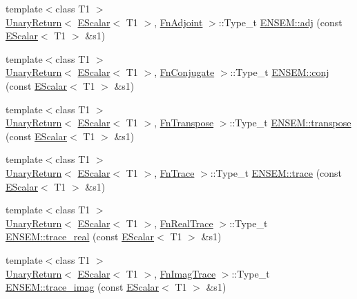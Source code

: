 \begin{DoxyCompactItemize}
\item 
{\footnotesize template$<$class T1 $>$ }\\\mbox{\hyperlink{structENSEM_1_1UnaryReturn}{Unary\+Return}}$<$ \mbox{\hyperlink{classENSEM_1_1EScalar}{E\+Scalar}}$<$ T1 $>$, \mbox{\hyperlink{structENSEM_1_1FnAdjoint}{Fn\+Adjoint}} $>$\+::Type\+\_\+t \mbox{\hyperlink{group__escalar_ga51071562edd203962f48e4b44f0c0a0c}{E\+N\+S\+E\+M\+::adj}} (const \mbox{\hyperlink{classENSEM_1_1EScalar}{E\+Scalar}}$<$ T1 $>$ \&s1)
\item 
{\footnotesize template$<$class T1 $>$ }\\\mbox{\hyperlink{structENSEM_1_1UnaryReturn}{Unary\+Return}}$<$ \mbox{\hyperlink{classENSEM_1_1EScalar}{E\+Scalar}}$<$ T1 $>$, \mbox{\hyperlink{structENSEM_1_1FnConjugate}{Fn\+Conjugate}} $>$\+::Type\+\_\+t \mbox{\hyperlink{group__escalar_ga291c7e9b7f872b3e6db0d75ff3421b6a}{E\+N\+S\+E\+M\+::conj}} (const \mbox{\hyperlink{classENSEM_1_1EScalar}{E\+Scalar}}$<$ T1 $>$ \&s1)
\item 
{\footnotesize template$<$class T1 $>$ }\\\mbox{\hyperlink{structENSEM_1_1UnaryReturn}{Unary\+Return}}$<$ \mbox{\hyperlink{classENSEM_1_1EScalar}{E\+Scalar}}$<$ T1 $>$, \mbox{\hyperlink{structENSEM_1_1FnTranspose}{Fn\+Transpose}} $>$\+::Type\+\_\+t \mbox{\hyperlink{group__escalar_ga5b02d7d8a00b851a2452fb03861a9401}{E\+N\+S\+E\+M\+::transpose}} (const \mbox{\hyperlink{classENSEM_1_1EScalar}{E\+Scalar}}$<$ T1 $>$ \&s1)
\item 
{\footnotesize template$<$class T1 $>$ }\\\mbox{\hyperlink{structENSEM_1_1UnaryReturn}{Unary\+Return}}$<$ \mbox{\hyperlink{classENSEM_1_1EScalar}{E\+Scalar}}$<$ T1 $>$, \mbox{\hyperlink{structENSEM_1_1FnTrace}{Fn\+Trace}} $>$\+::Type\+\_\+t \mbox{\hyperlink{group__escalar_ga4c3bf5ecccbf7b690868af26ec7d8ca6}{E\+N\+S\+E\+M\+::trace}} (const \mbox{\hyperlink{classENSEM_1_1EScalar}{E\+Scalar}}$<$ T1 $>$ \&s1)
\item 
{\footnotesize template$<$class T1 $>$ }\\\mbox{\hyperlink{structENSEM_1_1UnaryReturn}{Unary\+Return}}$<$ \mbox{\hyperlink{classENSEM_1_1EScalar}{E\+Scalar}}$<$ T1 $>$, \mbox{\hyperlink{structENSEM_1_1FnRealTrace}{Fn\+Real\+Trace}} $>$\+::Type\+\_\+t \mbox{\hyperlink{group__escalar_gac6853fb7b9f9b61b97cda696c804ab0a}{E\+N\+S\+E\+M\+::trace\+\_\+real}} (const \mbox{\hyperlink{classENSEM_1_1EScalar}{E\+Scalar}}$<$ T1 $>$ \&s1)
\item 
{\footnotesize template$<$class T1 $>$ }\\\mbox{\hyperlink{structENSEM_1_1UnaryReturn}{Unary\+Return}}$<$ \mbox{\hyperlink{classENSEM_1_1EScalar}{E\+Scalar}}$<$ T1 $>$, \mbox{\hyperlink{structENSEM_1_1FnImagTrace}{Fn\+Imag\+Trace}} $>$\+::Type\+\_\+t \mbox{\hyperlink{group__escalar_gad2c4bd25b83ec8aa100ff58b6b773d8c}{E\+N\+S\+E\+M\+::trace\+\_\+imag}} (const \mbox{\hyperlink{classENSEM_1_1EScalar}{E\+Scalar}}$<$ T1 $>$ \&s1)

\end{DoxyCompactItemize}
